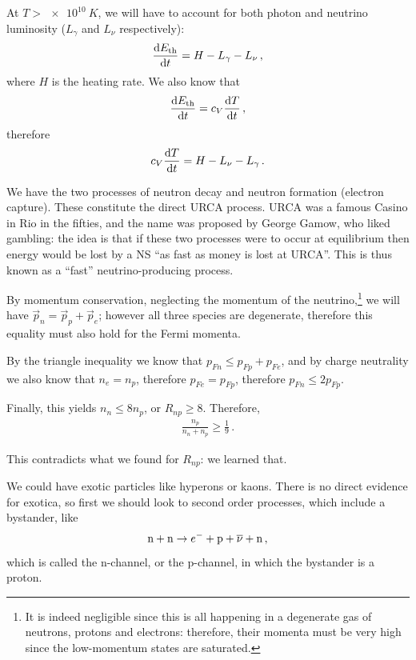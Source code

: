 \documentclass[main.tex]{subfiles}
\begin{document}
At \(T > \SI{e10}{K}\), we will have to account for both photon and neutrino luminosity (\(L_\gamma \) and \(L_\nu \) respectively): 
%
\begin{align}
\dv{E _{\text{th}}}{t} = H - L_\gamma - L_\nu 
\,,
\end{align}
%
where \(H\) is the heating rate. We also know that 
%
\begin{align}
\dv{E _{\text{th}}}{t} = c_V \dv{T }{t}
\,,
\end{align}
%
therefore 
%
\begin{align}
c_V \dv{T }{t} = H - L_\nu - L_\gamma 
\,.
\end{align}

We have the two processes of neutron decay and neutron formation (electron capture). These constitute the direct URCA process. 
URCA was a famous Casino in Rio in the fifties, and the name was proposed by George Gamow, who liked gambling: 
the idea is that if these two processes were to occur at equilibrium then energy would be lost by a NS ``as fast as money is lost at URCA''. This is thus known as a ``fast'' neutrino-producing process.

By momentum conservation, neglecting the momentum of the neutrino,\footnote{It is indeed negligible since this is all happening in a degenerate gas of neutrons, protons and electrons: therefore, their momenta must be very high since the low-momentum states are saturated.} we will have \(\vec{p}_n = \vec{p}_p + \vec{p}_e\); however all three species are degenerate, therefore this equality must also hold for the Fermi momenta. 

By the triangle inequality we know that \(p_{Fn} \leq p_{Fp} + p_{Fe}\), and by charge neutrality we also know that \(n_e = n_p\), therefore  \(p_{Fe} = p_{Fp}\), therefore \(p_{Fn} \leq 2 p_{Fp}\). 

Finally, this yields \(n_n \leq 8 n_p\), or \(R_{np} \geq 8\). Therefore, 
%
\begin{align}
\frac{n_p}{n_n + n_p} \geq \frac{1}{9}
\,.
\end{align}

This contradicts what we found for \(R_{np}\): we learned that. 

We could have exotic particles like hyperons or kaons.
There is no direct evidence for exotica, so first we should look to second order processes, which include a bystander, like
%
\begin{align}
\ce{n} + \ce{n} \to e^{-} + \ce{p} + \overline{\nu} + \ce{n}
\,,
\end{align}
%
which is called the n-channel, or the p-channel, in which the bystander is a proton. 
\end{document}
